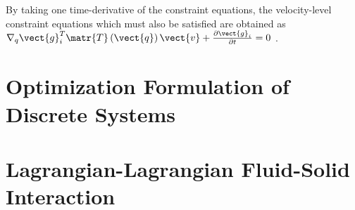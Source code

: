 By taking one time-derivative of the constraint equations, the velocity-level constraint equations which must also be satisfied are obtained as $\nabla_q \vect{g}_i^T \matr{T}\left(\vect{q}\right)\vect{v}+\frac{\partial\vect{g}_i}{\partial t}=0$ \cite{TasoraAnitescuCMAME10}.




\section{Optimization Formulation of Discrete Systems}
\section{Lagrangian-Lagrangian Fluid-Solid Interaction}
